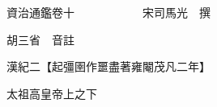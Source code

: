 










 


 
 


 

  
  
  
  
  





  
  
  
  
  
 
  

  

  
  
  



  

 
 

  
   




  

  
  


  　　資治通鑑卷十　　　　　　宋司馬光　撰

　　胡三省　音註

　　漢紀二【起彊圉作噩盡著雍閹茂凡二年】

　　太祖高皇帝上之下

